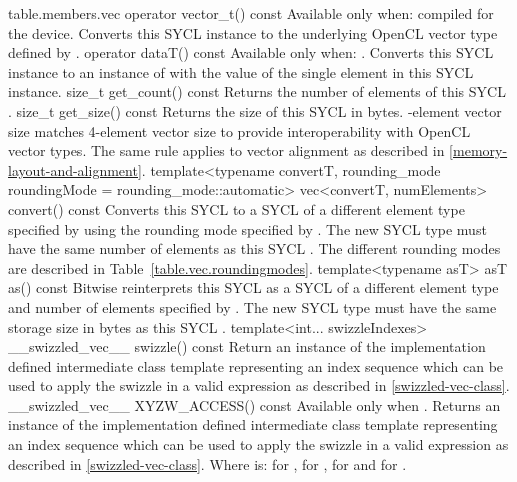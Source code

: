 {table.members.vec}
  \addRow
  {operator vector_t() const}
  {
    Available only when: compiled for the device.
    \newline
    Converts this SYCL  instance to the underlying OpenCL vector type
    defined by .
  }
  \addRow
  {operator dataT() const}
  {
    Available only when: .
    Converts this SYCL  instance to an instance of  with
    the value of the single element in this SYCL  instance.
  }
  \addRow
  {size_t get_count() const}
  {
    Returns the number of elements of this SYCL .
  }
  \addRow
  {size_t get_size() const}
  {
    Returns the size of this SYCL  in bytes.
    -element vector size matches 4-element vector size to provide
    interoperability with OpenCL vector types. The same rule applies to vector
    alignment as described in \ref{memory-layout-and-alignment}.
  }
  \addRowTwoL
  {template<typename convertT, rounding_mode roundingMode = rounding_mode::automatic>}
  {vec<convertT, numElements> convert() const}
  {
    Converts this SYCL  to a SYCL  of a different element type specified by  using the rounding mode specified by . The new SYCL  type must have the same number of elements as this SYCL . The different rounding modes are described in Table~\ref{table.vec.roundingmodes}.
  }
  \addRowTwoL
  {template<typename asT>}
  {asT as() const}
  {
    Bitwise reinterprets this SYCL  as a SYCL  of a different element type and number of elements specified by . The new SYCL  type must have the same storage size in bytes as this SYCL .
  }
  \addRowTwoL
    { template<int... swizzleIndexes> }
    {\__swizzled_vec__ swizzle() const}
    {
      Return an instance of the implementation defined intermediate class template  representing an index sequence which can be used to apply the swizzle in a valid expression as described in \ref{swizzled-vec-class}.
    }
  \addRow
    {\__swizzled_vec__ XYZW_ACCESS() const}
    {
      Available only when .
      \newline \newline
      Returns an instance of the implementation defined intermediate class template  representing an index sequence which can be used to apply the swizzle in a valid expression as described in \ref{swizzled-vec-class}.
      \newline \newline
      Where  is:  for ,  for ,  for  and  for .
    }
